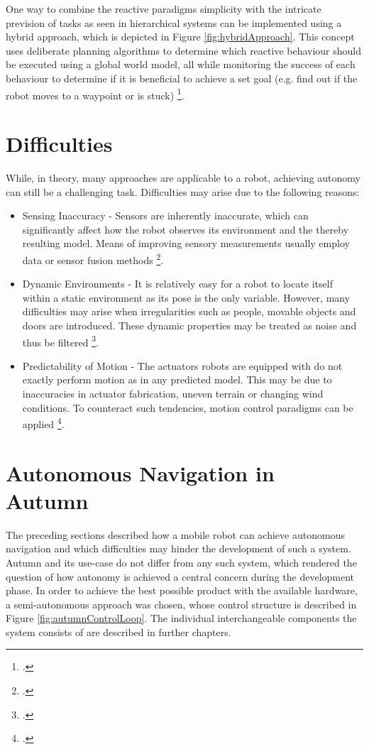One way to combine the reactive paradigms simplicity with the intricate prevision of tasks as seen in hierarchical systems can be implemented using a hybrid approach, which is depicted in Figure \ref{fig:hybridApproach}. 
This concept uses deliberate planning algorithms to determine which reactive behaviour should be executed using a global world model, all while monitoring the success of each behaviour to determine if it is beneficial to achieve a set goal (e.g. find out if the robot moves to a waypoint or is stuck) \footcite{faigl2017controlParadigms}.

\section{Difficulties}
While, in theory, many approaches are applicable to a robot, achieving autonomy can still be a challenging task. Difficulties may arise due to the following reasons:
\begin{itemize}
	\item Sensing Inaccuracy - Sensors are inherently inaccurate, which can significantly affect how the robot observes its environment and the thereby resulting model. Means of improving sensory measurements usually employ data or sensor fusion methods \footcite[Page 585]{siciliano2008springer}.
	\item Dynamic Environments - It is relatively easy for a robot to locate itself within a static environment as its pose is the only variable. However, many difficulties may arise when irregularities such as people, movable objects and doors are introduced. These dynamic properties may be treated as noise and thus be filtered \footcite[Pages 159 - 162]{thrun2002probabilisticRobotics}.
	\item Predictability of Motion - The actuators robots are equipped with do not exactly perform motion as in any predicted model. This may be due to inaccuracies in actuator fabrication, uneven terrain or changing wind conditions. To counteract such tendencies, motion control paradigms can be applied \footcite[Page 133]{siciliano2008springer}.
\end{itemize}

\section{Autonomous Navigation in Autumn}\label{autumnControlLoop}
The preceding sections described how a mobile robot can achieve autonomous navigation and which difficulties may hinder the development of such a system. Autumn and its use-case do not differ from any such system, which rendered the question of how autonomy is achieved a central concern during the development phase. 
In order to achieve the best possible product with the available hardware, a semi-autonomous approach was chosen, whose control structure is described in Figure \ref{fig:autumnControlLoop}.
The individual interchangeable components the system consists of are described in further chapters.

